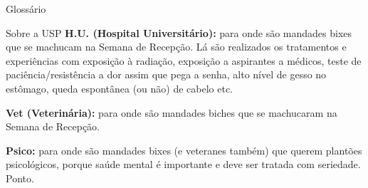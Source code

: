 \begin{secao}{Glossário}
\begin{subsecao}{Sobre a USP}
{\bf H.U. (Hospital Universitário):} para onde são mandades bixes que se
machucam na Semana de Recepção. Lá são realizados os tratamentos e experiências
com exposição à radiação, exposição a aspirantes a médicos, teste de
paciência/resistência a dor assim que pega a senha, alto nível de gesso no
estômago, queda espontânea (ou não) de cabelo etc.

{\bf Vet (Veterinária):} para onde são mandades biches que se machucaram na
Semana de Recepção.

{\bf Psico:} para onde são mandades bixes (e veteranes também) que querem
plantões psicológicos, porque saúde mental é importante e deve ser tratada com
seriedade. Ponto.

\end{subsecao}
\end{secao}
